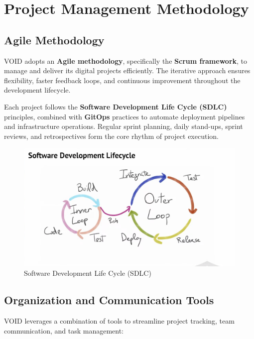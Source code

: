 \section{Project Management Methodology}

\subsection{Agile Methodology}
\noindent
VOID adopts an \textbf{Agile methodology}, specifically the \textbf{Scrum framework}, to manage and deliver its digital projects efficiently.  
The iterative approach ensures flexibility, faster feedback loops, and continuous improvement throughout the development lifecycle.

\medskip

\noindent
Each project follows the \textbf{Software Development Life Cycle (SDLC)} principles, combined with \textbf{GitOps} practices to automate deployment pipelines and infrastructure operations.  
Regular sprint planning, daily stand-ups, sprint reviews, and retrospectives form the core rhythm of project execution.
\begin{figure}[H]
    \centering
    \begin{minipage}{0.48\textwidth}
        \centering
        \includegraphics[width=\textwidth]{images/development-cycle.png}
        \caption{Software Development Life Cycle (SDLC)}
    \end{minipage}
\end{figure}


\subsection{Organization and Communication Tools}
\noindent
VOID leverages a combination of tools to streamline project tracking, team communication, and task management:

